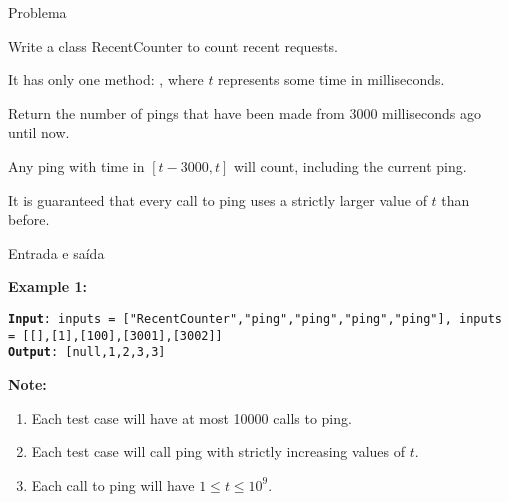 
\begin{frame}[fragile]{Problema}

Write a class RecentCounter to count recent requests.

It has only one method: , where $t$ represents some time in milliseconds.

Return the number of pings that have been made from 3000 milliseconds ago until now.

Any ping with time in $[t - 3000, t]$ will count, including the current ping.

It is guaranteed that every call to ping uses a strictly larger value of $t$ than before.

\end{frame}

\begin{frame}[fragile]{Entrada e saída}

\textbf{Example 1:}

\begin{small}
\texttt{\noindent \textbf{Input}: inputs = ["RecentCounter","ping","ping","ping","ping"], inputs = [[],[1],[100],[3001],[3002]] \\
\noindent \textbf{Output}: [null,1,2,3,3] 
}
\end{small}

\vspace{0.1in}

\textbf{Note:}

\begin{enumerate}
    \item Each test case will have at most 10000 calls to ping.
    \item Each test case will call ping with strictly increasing values of $t$.
    \item Each call to ping will have $1 \leq t \leq 10^9$.
\end{enumerate}

\end{frame}

